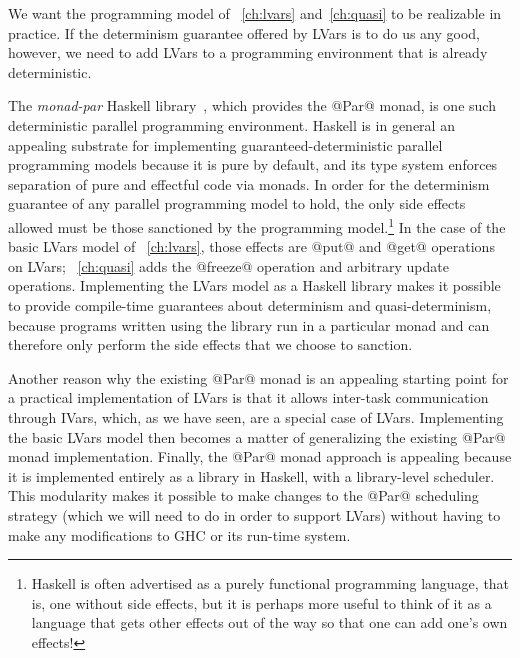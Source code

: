We want the programming model of ~\ref{ch:lvars}
and~\ref{ch:quasi} to be realizable in practice.  If the determinism
guarantee offered by LVars is to do us any good, however, we need to
add LVars to a programming environment that is already deterministic.

The \emph{monad-par} Haskell library~\cite{monad-par}, which provides
the @Par@ monad, is one such deterministic parallel programming
environment.  Haskell is in general an appealing substrate for
implementing guaranteed-deterministic parallel programming models
because it is pure by default, and its type system enforces separation
of pure and effectful code via monads.  In order for the determinism
guarantee of any parallel programming model to hold, the only side
effects allowed must be those sanctioned by the programming
model.\footnote{Haskell is often advertised as a purely functional
programming language, that is, one without side effects, but it is
perhaps more useful to think of it as a language that gets other
effects out of the way so that one can add one's own effects!}  In the
case of the basic LVars model of ~\ref{ch:lvars}, those effects
are @put@ and @get@ operations on LVars; ~\ref{ch:quasi} adds
the @freeze@ operation and arbitrary update operations.  Implementing
the LVars model as a Haskell library makes it possible to provide
compile-time guarantees about determinism and quasi-determinism,
because programs written using the library run in a particular monad
and can therefore only perform the side effects that we choose to
sanction.

Another reason why the existing @Par@ monad is an appealing starting
point for a practical implementation of LVars is that it allows
inter-task communication through IVars, which, as we have seen, are a
special case of LVars.  Implementing the basic LVars model then
becomes a matter of generalizing the existing @Par@ monad
implementation.  Finally, the @Par@ monad approach is appealing
because it is implemented entirely as a library in Haskell, with a
library-level scheduler.  This modularity makes it possible to make
changes to the @Par@ scheduling strategy (which we will need to do in
order to support LVars) without having to make any modifications to
GHC or its run-time system.


